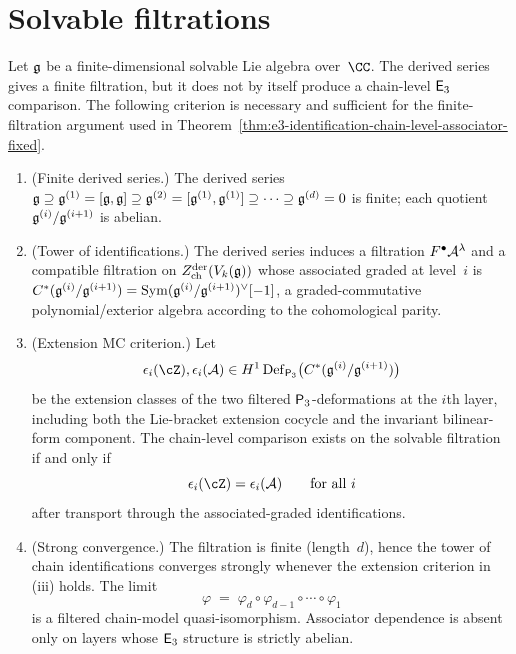 \section{Solvable filtrations}
\label{sec:solvable-filtration-criterion}

\begin{corollary}
\label{cor:e3-solvable-filtration-criterion}
\ClaimStatusConditional
Let $\mathfrak{g}$ be a finite-dimensional solvable Lie algebra
over~$\CC$. The derived series gives a finite filtration, but it
does not by itself produce a chain-level $\mathsf{E}_3$ comparison.
The following criterion is necessary and sufficient for the
finite-filtration argument used in
Theorem~\ref{thm:e3-identification-chain-level-associator-fixed}.

\begin{enumerate}[label=\textup{(\roman*)}]
\item \textup{(Finite derived series.)}
The derived series
$\mathfrak{g} \supseteq \mathfrak{g}^{(1)} = [\mathfrak{g},\mathfrak{g}]
\supseteq \mathfrak{g}^{(2)} = [\mathfrak{g}^{(1)},\mathfrak{g}^{(1)}]
\supseteq \cdots \supseteq \mathfrak{g}^{(d)} = 0$
is finite; each quotient $\mathfrak{g}^{(i)}/\mathfrak{g}^{(i+1)}$ is abelian.

\item \textup{(Tower of identifications.)}
The derived series induces a filtration
$F^\bullet \mathcal{A}^\lambda$ and a compatible filtration on
$Z^{\mathrm{der}}_{\mathrm{ch}}(V_k(\mathfrak{g}))$ whose
associated graded at level~$i$ is
$C^*(\mathfrak{g}^{(i)}/\mathfrak{g}^{(i+1)}) = \operatorname{Sym}(\mathfrak{g}^{(i)}/\mathfrak{g}^{(i+1)})^\vee
[-1]$,
a graded-commutative polynomial/exterior algebra according to the
cohomological parity.

\item \textup{(Extension MC criterion.)}
Let
\[
 \epsilon_i(\cZ),\epsilon_i(\cA)
 \in
 H^1\Def_{\Pthree}\bigl(C^*(\fg^{(i)}/\fg^{(i+1)})\bigr)
\]
be the extension classes of the two filtered $\mathsf{P}_3$-deformations
at the $i$th layer, including both the Lie-bracket extension cocycle
and the invariant bilinear-form component. The chain-level
comparison exists on the solvable filtration if and only if
\[
 \epsilon_i(\cZ)=\epsilon_i(\cA)
 \qquad\text{for all }i
\]
after transport through the associated-graded identifications.

\item \textup{(Strong convergence.)}
The filtration is finite
\textup{(}length~$d$\textup{)}, hence the tower of chain
identifications converges strongly whenever the extension criterion
in \textup{(iii)} holds. The limit
\[
 \varphi
 \;=\;
 \varphi_d \circ \varphi_{d-1} \circ \cdots \circ \varphi_1
\]
is a filtered chain-model quasi-isomorphism. Associator dependence
is absent only on layers whose $\mathsf{E}_3$ structure is strictly
abelian.


\end{enumerate}
\end{corollary}
